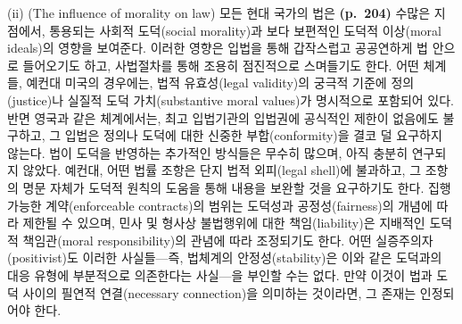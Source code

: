  (ii)  (The influence of morality on law) 모든
현대 국가의 법은 \textbf{(p.~204)} 수많은 지점에서, 통용되는 사회적
도덕(social morality)과 보다 보편적인 도덕적 이상(moral ideals)의
영향을 보여준다. 이러한 영향은 입법을 통해 갑작스럽고 공공연하게 법
안으로 들어오기도 하고, 사법절차를 통해 조용히 점진적으로 스며들기도
한다. 어떤 체계들, 예컨대 미국의 경우에는, 법적 유효성(legal
validity)의 궁극적 기준에 정의(justice)나 실질적 도덕 가치(substantive
moral values)가 명시적으로 포함되어 있다. 반면 영국과 같은 체계에서는,
최고 입법기관의 입법권에 공식적인 제한이 없음에도 불구하고, 그 입법은
정의나 도덕에 대한 신중한 부합(conformity)을 결코 덜 요구하지 않는다.
법이 도덕을 반영하는 추가적인 방식들은 무수히 많으며, 아직 충분히
연구되지 않았다. 예컨대, 어떤 법률 조항은 단지 법적 외피(legal
shell)에 불과하고, 그 조항의 명문 자체가 도덕적 원칙의 도움을 통해
내용을 보완할 것을 요구하기도 한다. 집행 가능한 계약(enforceable
contracts)의 범위는 도덕성과 공정성(fairness)의 개념에 따라 제한될 수
있으며, 민사 및 형사상 불법행위에 대한 책임(liability)은 지배적인
도덕적 책임관(moral responsibility)의 관념에 따라 조정되기도 한다.
어떤 실증주의자(positivist)도 이러한 사실들---즉, 법체계의
안정성(stability)은 이와 같은 도덕과의 대응 유형에 부분적으로
의존한다는 사실---을 부인할 수는 없다. 만약 이것이 법과 도덕 사이의
필연적 연결(necessary connection)을 의미하는 것이라면, 그 존재는
인정되어야 한다.

